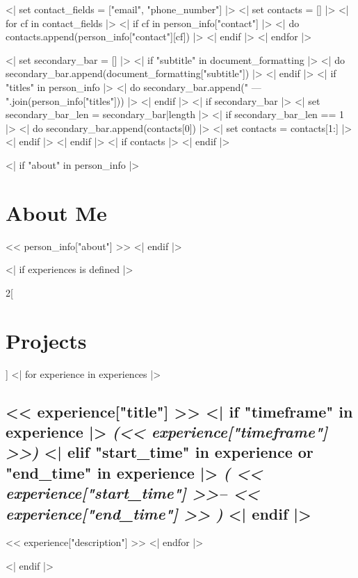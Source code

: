 \documentclass[10pt, letterpaper]{article}
\begin{document}
    
    <| set contact_fields = ["email", "phone_number"] |>
    <| set contacts = [] |>
    <| for cf in contact_fields |>
        <| if cf in person_info["contact"] |>
            <| do contacts.append(person_info["contact"][cf]) |>
        <| endif |>
    <| endfor |>
    
    <| set secondary_bar = [] |>
    <| if "subtitle" in document_formatting |>
        <| do secondary_bar.append(document_formatting["subtitle"]) |>
    <| endif |>
    <| if "titles" in person_info |>
        <| do secondary_bar.append(" --- ".join(person_info["titles"])) |>
    <| endif |>
    <| if secondary_bar |>
        <| set secondary_bar_len = secondary_bar|length |>
        <| if secondary_bar_len == 1 |>
            <| do secondary_bar.append(contacts[0]) |>
            <| set contacts = contacts[1:] |>
        <| endif |>
    <| endif |>
    <| if contacts |>
    <| endif |>
    
    <| if "about" in person_info |>
        \section{About Me}
        << person_info["about"] >>
        \vfill
    <| endif |>
    
    <| if experiences is defined |>
        \begin{multicols}{2}[\section{Projects}]
            \raggedcolumns
            <| for experience in experiences |> %
                \subsection{
                    << experience["title"] >> %
                    <| if "timeframe" in experience |>%
                        \textit{(<< experience["timeframe"] >>)}%
                    <| elif "start_time" in experience or
                            "end_time" in experience |>%
                        \textit{(%
                            << experience["start_time"] >>--%
                            << experience["end_time"] >>%
                        )}%
                    <| endif |>%
                }
                {
                    \setlength{\parindent}{10pt}%
                    << experience["description"] >>%
                }
            <| endfor |>
        \end{multicols}
        \vfill
    <| endif |>
    
\end{document}
